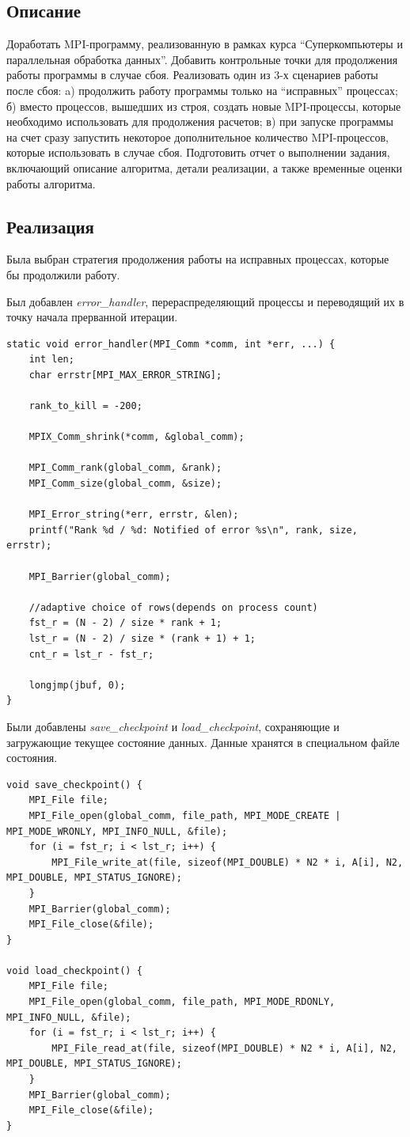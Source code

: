 \documentclass[a4paper,12pt,titlepage,final]{article}
\begin{document}
\subsection{Описание}
Доработать MPI-программу, реализованную в рамках курса “Суперкомпьютеры и параллельная обработка данных”. Добавить контрольные точки для продолжения работы программы в случае сбоя. Реализовать один из 3-х сценариев работы после сбоя: a) продолжить работу программы только на “исправных” процессах; б) вместо процессов, вышедших из строя, создать новые MPI-процессы, которые необходимо использовать для продолжения расчетов; в) при запуске программы на счет сразу запустить некоторое дополнительное количество MPI-процессов, которые использовать в случае сбоя.
Подготовить отчет о выполнении задания, включающий описание алгоритма, детали реализации, а также временные оценки работы алгоритма.
\subsection{Реализация}
Была выбран стратегия продолжения работы на исправных процессах, которые бы продолжили работу.\par
Был добавлен \textit{error\_handler}, перераспределяющий процессы и переводящий их в точку начала прерванной итерации.
\begin{verbatim}
static void error_handler(MPI_Comm *comm, int *err, ...) {
    int len;
    char errstr[MPI_MAX_ERROR_STRING];

    rank_to_kill = -200;

    MPIX_Comm_shrink(*comm, &global_comm);
    
    MPI_Comm_rank(global_comm, &rank);
    MPI_Comm_size(global_comm, &size);
    
    MPI_Error_string(*err, errstr, &len);
    printf("Rank %d / %d: Notified of error %s\n", rank, size, errstr);
    
    MPI_Barrier(global_comm);
    
    //adaptive choice of rows(depends on process count)
    fst_r = (N - 2) / size * rank + 1;
    lst_r = (N - 2) / size * (rank + 1) + 1;
    cnt_r = lst_r - fst_r;

    longjmp(jbuf, 0);
}
\end{verbatim}
Были добавлены \textit{save\_checkpoint} и \textit{load\_checkpoint}, сохраняющие и загружающие текущее состояние данных. Данные хранятся в специальном файле состояния.
\begin{verbatim}
void save_checkpoint() {
    MPI_File file;
    MPI_File_open(global_comm, file_path, MPI_MODE_CREATE | MPI_MODE_WRONLY, MPI_INFO_NULL, &file);
    for (i = fst_r; i < lst_r; i++) {
        MPI_File_write_at(file, sizeof(MPI_DOUBLE) * N2 * i, A[i], N2, MPI_DOUBLE, MPI_STATUS_IGNORE);
    }
    MPI_Barrier(global_comm);
    MPI_File_close(&file);
}

void load_checkpoint() {
    MPI_File file;
    MPI_File_open(global_comm, file_path, MPI_MODE_RDONLY, MPI_INFO_NULL, &file);
    for (i = fst_r; i < lst_r; i++) {
        MPI_File_read_at(file, sizeof(MPI_DOUBLE) * N2 * i, A[i], N2, MPI_DOUBLE, MPI_STATUS_IGNORE);
    }
    MPI_Barrier(global_comm);
    MPI_File_close(&file);
}
\end{verbatim}
\end{document}
